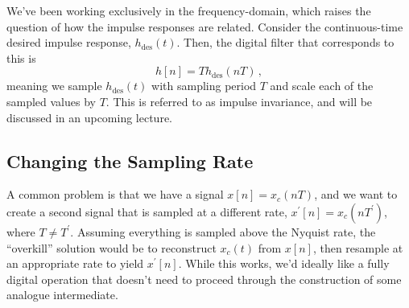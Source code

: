 %
We've been working exclusively in the frequency-domain, which raises the question
of how the impulse responses are related. Consider the continuous-time desired impulse
response, $h_\mathrm{des}(t)$. Then, the digital filter that corresponds to this
is
%
\begin{displaymath}
  h[n] = T h_\mathrm{des}(nT) \,,
\end{displaymath}
%
meaning we sample $h_\mathrm{des}(t)$ with sampling period $T$ and scale each of the
sampled values by $T$. This is referred to as \textrm{impulse invariance}, and will
be discussed in an upcoming lecture.

\subsection{Changing the Sampling Rate}
%
A common problem is that we have a signal $x[n] = x_c(nT)$, and we want to create
a second signal that is sampled at a different rate, $x^\prime[n] = x_c(nT^\prime)$,
where $T\neq T^\prime$. Assuming everything is sampled above the Nyquist rate, the
``overkill'' solution would be to reconstruct $x_c(t)$ from $x[n]$, then resample
at an appropriate rate to yield $x^\prime[n]$. While this works, we'd ideally like
a fully digital operation that doesn't need to proceed through the construction
of some analogue intermediate.

